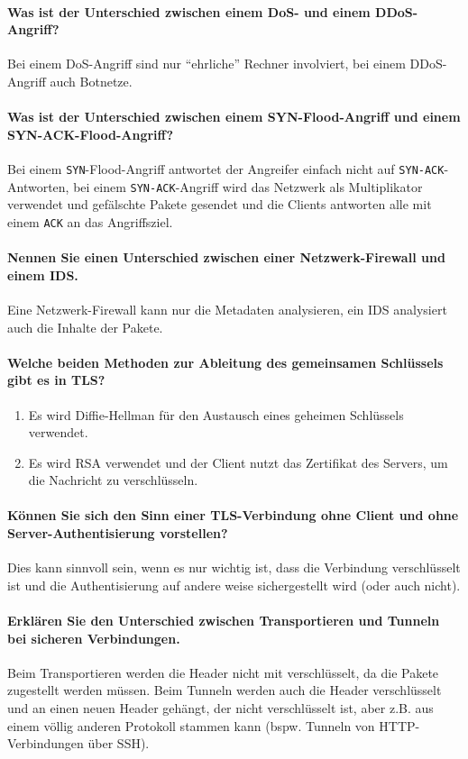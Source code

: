 		\paragraph{Was ist der Unterschied zwischen einem DoS- und einem DDoS-Angriff?}
			Bei einem DoS-Angriff sind nur \enquote{ehrliche} Rechner involviert, bei einem DDoS-Angriff auch Botnetze.

		\paragraph{Was ist der Unterschied zwischen einem SYN-Flood-Angriff und einem SYN-ACK-Flood-Angriff?}
			Bei einem \texttt{SYN}-Flood-Angriff antwortet der Angreifer einfach nicht auf \texttt{SYN-ACK}-Antworten, bei einem \texttt{SYN-ACK}-Angriff wird das Netzwerk als Multiplikator verwendet und gefälschte Pakete gesendet und die Clients antworten alle mit einem \texttt{ACK} an das Angriffsziel.

		\paragraph{Nennen Sie einen Unterschied zwischen einer Netzwerk-Firewall und einem IDS.}
			Eine Netzwerk-Firewall kann nur die Metadaten analysieren, ein IDS analysiert auch die Inhalte der Pakete.

		\paragraph{Welche beiden Methoden zur Ableitung des gemeinsamen Schlüssels gibt es in TLS?}
			\begin{enumerate}
				\item Es wird Diffie-Hellman für den Austausch eines geheimen Schlüssels verwendet.
				\item Es wird RSA verwendet und der Client nutzt das Zertifikat des Servers, um die Nachricht zu verschlüsseln.
			\end{enumerate}

		\paragraph{Können Sie sich den Sinn einer TLS-Verbindung ohne Client und ohne Server-Authentisierung vorstellen?}
			Dies kann sinnvoll sein, wenn es nur wichtig ist, dass die Verbindung verschlüsselt ist und die Authentisierung auf andere weise sichergestellt wird (oder auch nicht).

		\paragraph{Erklären Sie den Unterschied zwischen Transportieren und Tunneln bei sicheren Verbindungen.}
			Beim Transportieren werden die Header nicht mit verschlüsselt, da die Pakete zugestellt werden müssen. Beim Tunneln werden auch die Header verschlüsselt und an einen neuen Header gehängt, der nicht verschlüsselt ist, aber z.B. aus einem völlig anderen Protokoll stammen kann (bspw. Tunneln von HTTP-Verbindungen über SSH).

